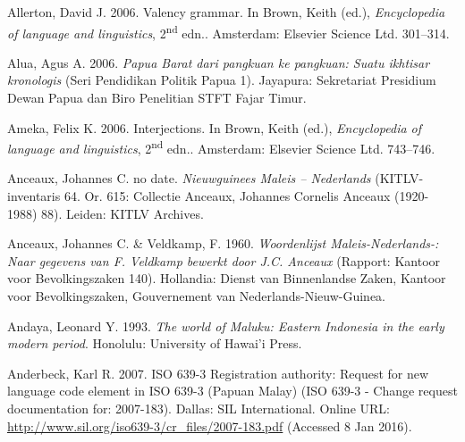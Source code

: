 \begin{styleCitaviBibliographyEntry}
Allerton, David J. 2006. Valency grammar. In Brown, Keith (ed.), \textit{Encyclopedia of language and linguistics}, 2\textsuperscript{nd} edn.. Amsterdam: Elsevier Science Ltd. 301–314.
\end{styleCitaviBibliographyEntry}

\begin{styleCitaviBibliographyEntry}
Alua, Agus A. 2006. \textit{Papua Barat dari pangkuan ke pangkuan: Suatu ikhtisar kronologis} (Seri Pendidikan Politik Papua 1). Jayapura: Sekretariat Presidium Dewan Papua dan Biro Penelitian STFT Fajar Timur.
\end{styleCitaviBibliographyEntry}

\begin{styleCitaviBibliographyEntry}
Ameka, Felix K. 2006. Interjections. In Brown, Keith (ed.), \textit{Encyclopedia of language and linguistics}, 2\textsuperscript{nd} edn.. Amsterdam: Elsevier Science Ltd. 743–746.
\end{styleCitaviBibliographyEntry}

\begin{styleCitaviBibliographyEntry}
Anceaux, Johannes C. no date. \textit{Nieuwguinees Maleis – Nederlands} (KITLV-inventaris 64. Or. 615: Collectie Anceaux, Johannes Cornelis Anceaux (1920-1988) 88). Leiden: KITLV Archives.
\end{styleCitaviBibliographyEntry}

\begin{styleCitaviBibliographyEntry}
Anceaux, Johannes C. \& Veldkamp, F. 1960. \textit{Woordenlijst Maleis-Nederlands-: Naar gegevens van F. Veldkamp bewerkt door J.C. Anceaux} (Rapport: Kantoor voor Bevolkingszaken 140). Hollandia: Dienst van Binnenlandse Zaken, Kantoor voor Bevolkingszaken, Gouvernement van Nederlands-Nieuw-Guinea.
\end{styleCitaviBibliographyEntry}

\begin{styleCitaviBibliographyEntry}
Andaya, Leonard Y. 1993. \textit{The world of Maluku: Eastern Indonesia in the early modern period}. Honolulu: University of Hawai’i Press.
\end{styleCitaviBibliographyEntry}

\begin{styleCitaviBibliographyEntry}
Anderbeck, Karl R. 2007. ISO 639-3 Registration authority: Request for new language code element in ISO 639-3 (Papuan Malay) (ISO 639-3 - Change request documentation for: 2007-183). Dallas: SIL International. Online URL: \url{http://www.sil.org/iso639-3/cr_files/2007-183.pdf} (Accessed 8 Jan 2016).
\end{styleCitaviBibliographyEntry}

